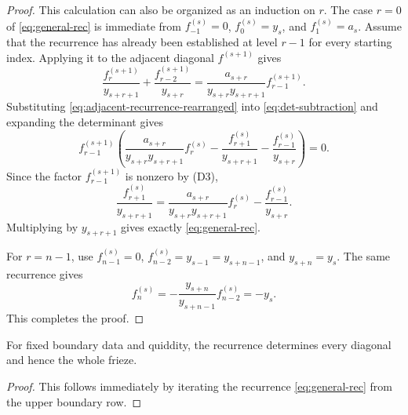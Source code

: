 \documentclass[amstex,11pt,reqno]{amsart}
\newtheorem{corollary}[theorem]{Corollary}
\theoremstyle{definition}
\newcommand{\by}{\bm{y}}
\newcommand{\ba}{\bm{a}}
\begin{document}
\begin{proof}
This calculation can also be organized as an induction on $r$.  The case
$r=0$ of \eqref{eq:general-rec} is immediate from
$f^{(s)}_{-1}=0$, $f^{(s)}_0=y_s$, and $f^{(s)}_1=a_s$.
Assume that the recurrence has already been established at level $r-1$
for every starting index.  Applying it to the adjacent diagonal
$f^{(s+1)}$ gives
\begin{equation}\label{eq:adjacent-recurrence-rearranged}
 \frac{f^{(s+1)}_r}{y_{s+r+1}}
 +
 \frac{f^{(s+1)}_{r-2}}{y_{s+r}}
 =
 \frac{a_{s+r}}{y_{s+r}y_{s+r+1}}
 f^{(s+1)}_{r-1}.
\end{equation}
Substituting \eqref{eq:adjacent-recurrence-rearranged} into
\eqref{eq:det-subtraction} and expanding the determinant gives
\[
 f^{(s+1)}_{r-1}
 \left(
 \frac{a_{s+r}}{y_{s+r}y_{s+r+1}}f^{(s)}_r
 -
 \frac{f^{(s)}_{r+1}}{y_{s+r+1}}
 -
 \frac{f^{(s)}_{r-1}}{y_{s+r}}
 \right)
 =0.
\]
Since the factor
$f^{(s+1)}_{r-1}$ is nonzero by {\rm (D3)}, 
\[
 \frac{f^{(s)}_{r+1}}{y_{s+r+1}}
 =
 \frac{a_{s+r}}{y_{s+r}y_{s+r+1}}f^{(s)}_r
 -
 \frac{f^{(s)}_{r-1}}{y_{s+r}}.
\]
Multiplying by $y_{s+r+1}$ gives exactly \eqref{eq:general-rec}.

For $r=n-1$, use $f^{(s)}_{n-1}=0$, $f^{(s)}_{n-2}=y_{s-1}=y_{s+n-1}$, and $y_{s+n}=y_s$. The same recurrence gives
\[
 f^{(s)}_n
 =-\frac{y_{s+n}}{y_{s+n-1}}f^{(s)}_{n-2}
 =-y_s.
\]
This completes the proof.
\end{proof}

For fixed boundary data and quiddity, the recurrence determines every diagonal and hence the whole frieze.


\begin{proof}
This follows immediately by iterating the recurrence \eqref{eq:general-rec} from the upper boundary row.
\end{proof}
\end{document}
